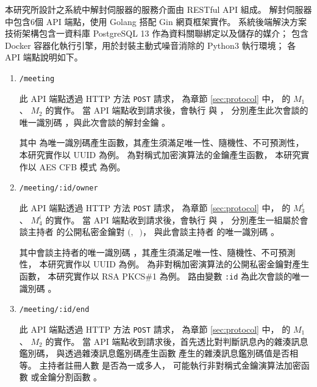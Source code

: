     本研究所設計之系統中解封伺服器的服務介面由 RESTful\cite{fielding2000architectural} API 組成。
解封伺服器 \DEFserver 中包含6個 API 端點，使用 Golang 搭配 Gin 網頁框架實作。
系統後端解決方案技術架構包含一資料庫 PostgreSQL 13 作為資料關聯綁定以及儲存的媒介；
包含 Docker 容器化執行引擎，用於封裝主動式噪音消除的 Python3 執行環境；
各 API 端點說明如下。

\begin{enumerate}
    \item \texttt{/meeting}

        此 API 端點透過 HTTP 方法 \texttt{POST} 請求，
    為章節 \ref{sec:protocol} 中，
     的 $M_{1}$ 、 $M_{2}$ 的實作。
    當 API 端點收到請求後，會執行 \DEFfuncIDgen{} 與 \DEFfuncKgen{}，
    分別產生此次會談的唯一識別碼 \DEFsessionID，與此次會談的解封金鑰 \DEFunsealKey。

        其中 \DEFfuncIDgen{} 為唯一識別碼產生函數，其產生須滿足唯一性、隨機性、不可預測性，
    本研究實作以 UUID \cite{rfc4122} 為例。
    \DEFfuncKgen{} 為對稱式加密演算法的金鑰產生函數，
    本研究實作以 AES CFB 模式 \cite{117146}\cite{9171} 為例。

    \item \texttt{/meeting/:id/owner}

        此 API 端點透過 HTTP 方法 \texttt{POST} 請求，
    為章節 \ref{sec:protocol}  中，
     的 $M_{3}^{i}$ 、 $M_{4}^{i}$ 的實作。
    當 API 端點收到請求後，會執行 \DEFfuncPKgen{} 與 \DEFfuncIDgen{}，
    分別產生一組屬於會談主持者 \DEFowner 的公開私密金鑰對 $($\DEFpublicKey$,~$ \DEFprivateKey$)$，
    與此會談主持者 \DEFowner 的唯一識別碼 \DEFownerID。

        其中會談主持者的唯一識別碼 \DEFownerID，其產生須滿足唯一性、隨機性、不可預測性，
    本研究實作以 UUID \cite{rfc4122} 為例。
    \DEFfuncPKgen{} 為非對稱加密演算法的公開私密金鑰對產生函數，
    本研究實作以 RSA PKCS\#1 \cite{rfc8017} 為例。
    路由變數 \texttt{:id} 為此次會談的唯一識別碼 \DEFsessionID。

    \item \texttt{/meeting/:id/end}

        此 API 端點透過 HTTP 方法 \texttt{POST} 請求，
    為章節 \ref{sec:protocol} 中，
     的 $M_{1}$ 、 $M_{2}$ 的實作。
    當 API 端點收到請求後，首先透比對判斷訊息內的雜湊訊息鑑別碼，
    與透過雜湊訊息鑑別碼產生函數 \DEFfuncHMAC{} 產生的雜湊訊息鑑別碼值是否相等。
    主持者註冊人數 \DEFowreg 是否為一或多人，
    可能執行非對稱式金鑰演算法加密函數 \DEFfuncEncPK{} 或金鑰分割函數 \DEFfuncSSS{}。


\end{enumerate}
